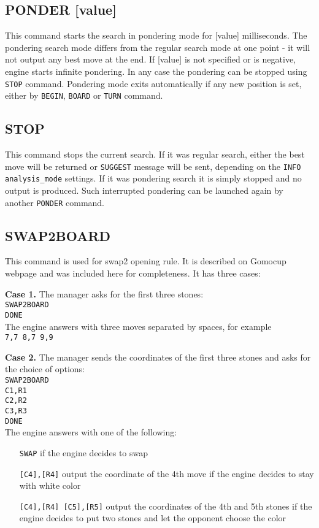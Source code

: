 \documentclass[12pt,a4paper]{article}
\begin{document}
\subsection{PONDER [value]}
\label{cmd_ponder}
This command starts the search in pondering mode for [value] milliseconds. The pondering search mode differs from the regular search mode at one point - it will not output any best move at the end. If [value] is not specified or is negative, engine starts infinite pondering. In any case the pondering can be stopped using \texttt{STOP} command. Pondering mode exits automatically if any new position is set, either by \texttt{BEGIN}, \texttt{BOARD} or \texttt{TURN} command.


\subsection{STOP}
\label{cmd_stop}
This command stops the current search. If it was regular search, either the best move will be returned or \texttt{SUGGEST} message will be sent, depending on the \texttt{INFO analysis{\_}mode} settings. If it was pondering search it is simply stopped and no output is produced. Such interrupted pondering can be launched again by another \texttt{PONDER} command.


\subsection{SWAP2BOARD}
\label{cmd_swap2board}
This command is used for swap2 opening rule. It is described on Gomocup webpage and was included here for completeness. It has three cases:

\textbf{Case 1.} The manager asks for the first three stones:\\
\texttt{SWAP2BOARD}\\
\texttt{DONE}\\
The engine answers with three moves separated by spaces, for example\\
\texttt{7,7 8,7 9,9}

\textbf{Case 2.} The manager sends the coordinates of the first three stones and asks for the choice of options:\\
\texttt{SWAP2BOARD}\\
\texttt{C1,R1}\\
\texttt{C2,R2}\\
\texttt{C3,R3}\\
\texttt{DONE}\\
The engine answers with one of the following:
\begin{enumerate}[leftmargin=7.5em]
\item[\texttt{SWAP}]{if the engine decides to swap}
\item[\texttt{[C4],[R4]}]{output the coordinate of the 4th move if the engine decides to stay with white color}
\item[\texttt{[C4],[R4] [C5],[R5]}]{output the coordinates of the 4th and 5th stones if the engine decides to put two stones and let the opponent choose the color}
\end{enumerate}
\end{document}
